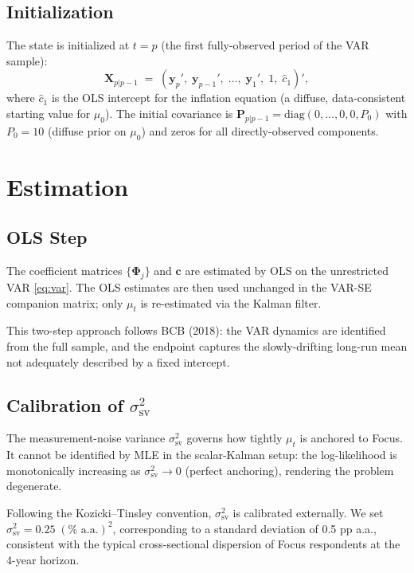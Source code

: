 \documentclass[12pt, a4paper]{article}
\newcommand{\diag}{\mathrm{diag}}
\newcommand{\bs}[1]{\boldsymbol{#1}}
\begin{document}
\subsection{Initialization}

The state is initialized at $t=p$ (the first fully-observed period of the
VAR sample):
\begin{equation}
    \bs{X}_{p|p-1} \;=\;
    \left(\bs{y}_p',\;\bs{y}_{p-1}',\;\ldots,\;\bs{y}_1',\;1,\;\hat{c}_1\right)',
\end{equation}
where $\hat{c}_1$ is the OLS intercept for the inflation equation (a
diffuse, data-consistent starting value for $\mu_0$). The initial covariance
is $\bs{P}_{p|p-1} = \diag(0,\ldots,0,0,P_0)$ with $P_0=10$ (diffuse prior
on $\mu_0$) and zeros for all directly-observed components.

\section{Estimation}
\label{sec:estimation}

\subsection{OLS Step}

The coefficient matrices $\{\bs{\Phi}_j\}$ and $\bs{c}$ are estimated by
OLS on the unrestricted VAR \eqref{eq:var}. The OLS estimates are then
used unchanged in the VAR-SE companion matrix; only $\mu_t$ is re-estimated
via the Kalman filter.

This two-step approach follows BCB (2018): the VAR dynamics are identified
from the full sample, and the endpoint captures the slowly-drifting
long-run mean not adequately described by a fixed intercept.

\subsection{Calibration of \texorpdfstring{$\sigma^2_{\mathrm{sv}}$}{sigma2\_survey}}

The measurement-noise variance $\sigma^2_{\mathrm{sv}}$ governs how
tightly $\mu_t$ is anchored to Focus. It cannot be identified by MLE
in the scalar-Kalman setup: the log-likelihood is monotonically increasing
as $\sigma^2_{\mathrm{sv}}\to 0$ (perfect anchoring), rendering the
problem degenerate.

Following the Kozicki--Tinsley convention, $\sigma^2_{\mathrm{sv}}$ is
calibrated externally. We set
$\sigma^2_{\mathrm{sv}} = 0.25\;(\%\text{ a.a.})^2$, corresponding to a
standard deviation of 0.5 pp a.a., consistent with the typical
cross-sectional dispersion of Focus respondents at the 4-year horizon.
\end{document}
